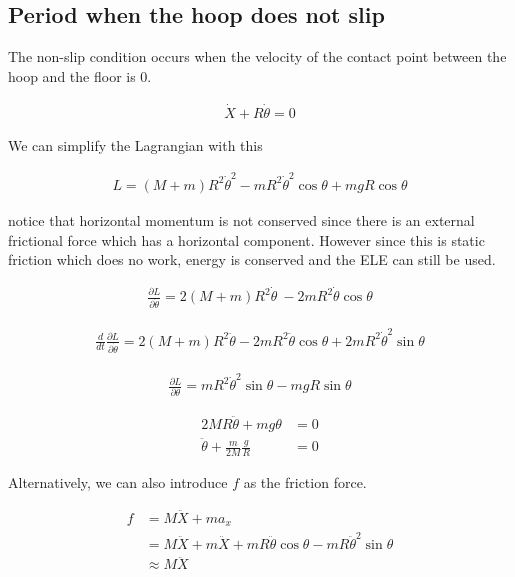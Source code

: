 \documentclass{article}
\begin{document}
\subsection{Period when the hoop does not slip}

The non-slip condition occurs when the velocity of the contact point between the hoop and the floor is $0$.

\begin{align*}
\dot X + R\dot\theta = 0
\end{align*}

We can simplify the Lagrangian with this

\begin{align*}
L = (M+m)R^2\dot\theta^2 - mR^2\dot\theta^2\cos\theta + mgR\cos\theta
\end{align*}

notice that horizontal momentum is not conserved since there is an external frictional force which has a horizontal component. However since this is static friction which does no work, energy is conserved and the ELE can still be used.

\begin{align*}
\frac{\partial L}{\partial \dot\theta} = 2(M+m)R^2\dot\theta\ - 2mR^2\dot\theta\cos\theta
\end{align*}

\begin{align*}
\frac{d}{dt} \frac{\partial L}{\partial \dot\theta} = 2(M+m)R^2\ddot\theta - 2mR^2\ddot\theta\cos\theta + 2mR^2\dot\theta^2\sin\theta
\end{align*}

\begin{align*}
\frac{\partial L}{\partial \theta} = m  R^2\dot\theta^2\sin\theta - mgR\sin\theta
\end{align*}

\begin{align*}
2MR\ddot\theta + mg\theta &= 0 \\
\ddot\theta + \frac{m}{2M}\frac{g}{R} &= 0
\end{align*}

Alternatively, we can also introduce $f$ as the friction force.

\begin{align*}
f &= M\ddot{X} + ma_x \\
&=M\ddot{X} + m\ddot{X} + mR\ddot\theta\cos\theta - mR\ddot\theta^2\sin\theta \\
&\approx M\ddot{X}
\end{align*}
\end{document}

